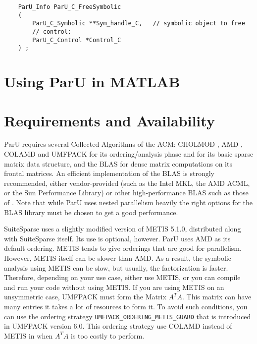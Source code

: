 \documentclass[12pt]{article}
\begin{document}
    {\footnotesize
    \begin{verbatim}
    ParU_Info ParU_C_FreeSymbolic
    (
        ParU_C_Symbolic **Sym_handle_C,   // symbolic object to free
        // control:
        ParU_C_Control *Control_C
    ) ; \end{verbatim} }

\section{Using ParU in MATLAB}


\section{Requirements and Availability}
\label{summary}

ParU requires several Collected Algorithms of the ACM: CHOLMOD
\cite{ChenDavisHagerRajamanickam09,DavisHager09}, AMD
\cite{AmestoyDavisDuff96,AmestoyDavisDuff03}, COLAMD
\cite{DavisGilbertLarimoreNg00_algo,DavisGilbertLarimoreNg00} and UMFPACK
\cite{10.1145/992200.992206} for its ordering/analysis phase and for its basic
sparse matrix data structure, and the BLAS \cite{dddh:90} for dense matrix
computations on its frontal matrices.  An efficient implementation of the BLAS
is strongly recommended, either vendor-provided (such as the Intel MKL, the AMD
ACML, or the Sun Performance Library) or other high-performance BLAS such as
those of \cite{GotoVanDeGeijn08}. Note that while ParU uses nested parallelism
heavily the right options for the BLAS library must be chosen to get a good
performance.

SuiteSparse uses a slightly modified version of METIS 5.1.0, distributed along
with SuiteSparse itself.  Its use is optional, however. ParU uses AMD as its
default ordering. METIS tends to give orderings that are good for parallelism.
However, METIS itself can be slower than AMD. As a result, the symbolic
analysis using METIS can be slow, but usually, the factorization is faster.
Therefore, depending on your use case, either use METIS, or you can compile and
run your code without using METIS.  If you are using METIS on an unsymmetric
case, UMFPACK must form the Matrix $A^{T}A$. This matrix can have many entries
it takes a lot of resources to form it. To avoid such conditions, you can use
the ordering strategy \verb'UMFPACK_ORDERING_METIS_GUARD' that is introduced in
UMFPACK version 6.0.  This ordering strategy use COLAMD instead of METIS in
when $A^T A$ is too costly to perform.
\end{document}
